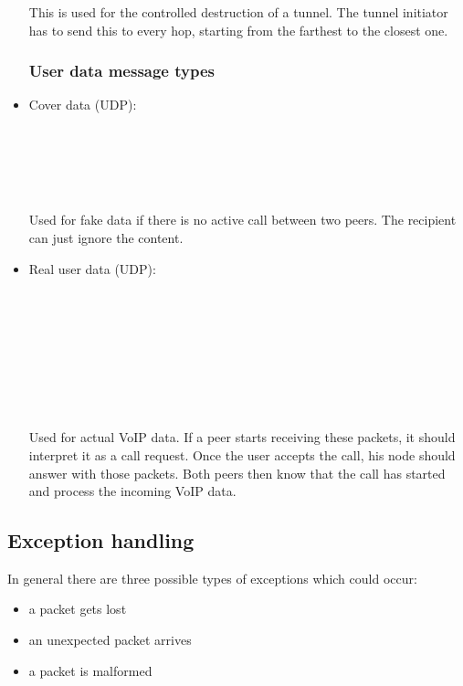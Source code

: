 \documentclass{article}
\begin{document}
\begin{itemize}
	This is used for the controlled destruction of a tunnel. The tunnel initiator has to send this to every hop, starting from the farthest to the closest one.

\subsubsection{User data message types}
\label{subsec:user_data_message_types}

\item Cover data (UDP): 


	\begin{bytefield}[bitwidth=1.0em]{32}
	 \\
	  \\
	 \\
	\skippedwords \\
	\end{bytefield}


	Used for fake data if there is no active call between two peers. The recipient can just ignore the content.
\newpage

\item Real user data (UDP): 


	\begin{bytefield}[bitwidth=1.0em]{32}
		 \\
		  \\
		 \\
		\skippedwords \\
		 \\
		 \\
		\skippedwords \\
	\end{bytefield}

	Used for actual VoIP data. If a peer starts receiving these packets, it should interpret it as a call request. Once the user accepts the call, his node should answer with those packets. Both peers then know that the call has started and process the incoming VoIP data.

\end{itemize}

\subsection{Exception handling}
In general there are three possible types of exceptions which could occur:
\begin{itemize}
\item a packet gets lost
\item an unexpected packet arrives
\item a packet is malformed
\end{itemize}
\end{document}
